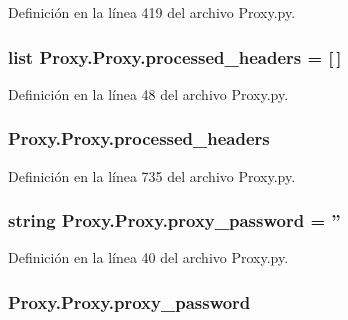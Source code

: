 Definición en la línea 419 del archivo Proxy.\-py.

\hypertarget{class_proxy_1_1_proxy_a83e27fbf0f02ac854aa73b8adf95b1e1}{
\subsubsection[{processed\-\_\-headers}]{\setlength{\rightskip}{0pt plus 5cm}list Proxy.\-Proxy.\-processed\-\_\-headers = \mbox{[}$\,$\mbox{]}\hspace{0.3cm}{\ttfamily [static]}}}\label{class_proxy_1_1_proxy_a83e27fbf0f02ac854aa73b8adf95b1e1}


Definición en la línea 48 del archivo Proxy.\-py.

\hypertarget{class_proxy_1_1_proxy_a53d61e9b00af20aa42fcf1f8c5b3f2d9}{
\subsubsection[{processed\-\_\-headers}]{\setlength{\rightskip}{0pt plus 5cm}Proxy.\-Proxy.\-processed\-\_\-headers}}\label{class_proxy_1_1_proxy_a53d61e9b00af20aa42fcf1f8c5b3f2d9}


Definición en la línea 735 del archivo Proxy.\-py.

\hypertarget{class_proxy_1_1_proxy_ac53a135a1f0cd666c4a4136e433bbaab}{
\subsubsection[{proxy\-\_\-password}]{\setlength{\rightskip}{0pt plus 5cm}string Proxy.\-Proxy.\-proxy\-\_\-password = ''\hspace{0.3cm}{\ttfamily [static]}}}\label{class_proxy_1_1_proxy_ac53a135a1f0cd666c4a4136e433bbaab}


Definición en la línea 40 del archivo Proxy.\-py.

\hypertarget{class_proxy_1_1_proxy_a3a1b288bb4785d556eaf48f81a938f16}{
\subsubsection[{proxy\-\_\-password}]{\setlength{\rightskip}{0pt plus 5cm}Proxy.\-Proxy.\-proxy\-\_\-password}}\label{class_proxy_1_1_proxy_a3a1b288bb4785d556eaf48f81a938f16}


